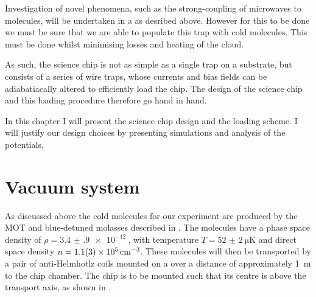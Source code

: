 
Investigation of novel phenomena, such as the strong-coupling of microwaves to
molecules, will be undertaken in a  as desribed above. However
for this to be done we must be sure that we are able to populate this trap with
cold molecules. This must be done whilst minimising losses and heating of the
cloud.

As such, the science chip is not as simple as a single trap on a substrate, but
consists of a series of wire traps, whose currents and bias fields can be
adiabatiacally altered to efficiently load the chip. The design of the science
chip and this loading procedure therefore go hand in hand.

In this chapter I will present the science chip design and the loading scheme.
I will justify our design choices by presenting simulations and analysis of the
potentials. 



\section{Vacuum system}



As discussed above  the cold \CaF{} molecules for our experiment
are produced by the MOT and blue-detuned molasses described in
. The molecules have a phase space density of
$\rho=\SI{3.4(9)e-12}{}$, with temperature $T=\SI{52(2)}{\micro\kelvin}$ and
direct space density $n=\SI{1.1(3)E5}{\per\centi\meter\cubed}$. These molecules
will then be transported by a pair of anti-Helmhotlz coils mounted on a
 over a distance of approximately \SI{1}{\meter} to the chip chamber.
The chip is to be mounted such that its centre is 
above the transport axis, as shown in .


